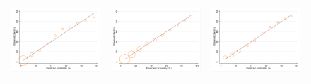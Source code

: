 \documentclass[submission]{grattan}
\begin{document}
\begin{figure}
\begin{tabularx}{\linewidth}{@{}C@{}C@{}C@{}}
\includegraphics{atlas/Calib_bariatric.png} & \includegraphics{atlas/Calib_cardio.png} & \includegraphics{atlas/Calib_KR.png} \\

\end{tabularx}
\end{figure}
\end{document}
